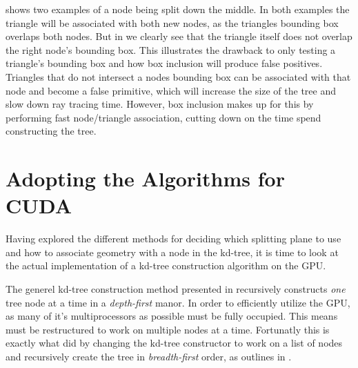  shows two examples of a node being split
down the middle. In both examples the triangle will be associated with
both new nodes, as the triangles bounding box overlaps both nodes. But
in  we clearly see that the triangle
itself does not overlap the right node's bounding box. This
illustrates the drawback to only testing a triangle's bounding box and
how box inclusion will produce false positives. Triangles that do not
intersect a nodes bounding box can be associated with that node and
become a false primitive, which will increase the size of the tree and
slow down ray tracing time. However, box inclusion makes up for this
by performing fast node/triangle association, cutting down on the time
spend constructing the tree.









\section{Adopting the Algorithms for CUDA}


Having explored the different methods for deciding which splitting
plane to use and how to associate geometry with a node in the kd-tree,
it is time to look at the actual implementation of a kd-tree
construction algorithm on the GPU.

The generel kd-tree construction method presented in
 recursively constructs \textit{one} tree
node at a time in a \textit{depth-first} manor. In order to
efficiently utilize the GPU, as many of it's multiprocessors as
possible must be fully occupied. This means 
must be restructured to work on multiple nodes at a time. Fortunatly
this is exactly what \zhou{} did by changing the kd-tree constructor
to work on a list of nodes and recursively create the tree in
\textit{breadth-first} order, as outlines in
.

